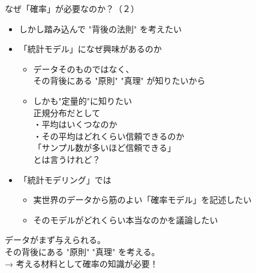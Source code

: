 \documentclass[dvipdfmx,cjk]{beamer}
\begin{document}
\begin{frame}{なぜ「確率」が必要なのか？（２）}

\begin{itemize}

    \item しかし踏み込んで "背後の法則" を考えたい \pause

    \item 「統計モデル」になぜ興味があるのか\pause
        \begin{itemize}
        \item データそのものではなく、\\その背後にある "原則" "真理" が知りたいから\\\pause
        \item しかも"定量的"に知りたい\\ \pause
        正規分布だとして \\ \pause
        ・平均はいくつなのか \\ \pause
        ・その平均はどれくらい信頼できるのか \\ \pause
        「サンプル数が多いほど信頼できる」\\
        とは言うけれど？
        \end{itemize}
        
    \pause
    \item 「統計モデリング」では \pause
    \pause
        \begin{itemize}
        \item 実世界のデータから筋のよい「確率モデル」を記述したい
        \item そのモデルがどれくらい本当なのかを議論したい
        \end{itemize}

    \pause

\end{itemize}

\vskip 0.3cm

データがまず与えられる。\\ \pause
その背後にある "原則" "真理" を考える。\\ \pause
→ 考える材料として確率の知識が必要！

\end{frame}
\end{document}
